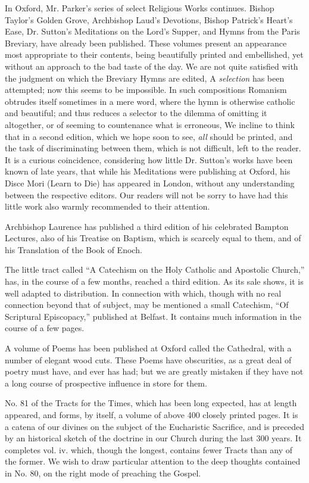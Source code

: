 In Oxford, Mr. Parker's series of select Religious
Works continues. Bishop Taylor's Golden Grove, Archbishop Laud's
Devotions, Bishop Patrick's Heart's Ease, Dr. Sutton's Meditations on
the Lord's Supper, and Hymns from the Paris Breviary, have already been
published. These volumes present an appearance most appropriate to their
contents, being beautifully printed and embellished, yet without an
approach to the bad taste of the day. We are not quite satisfied with
the judgment on which the Breviary Hymns are edited, A \emph{selection}
has been attempted; now this seems to be impossible. In such
compositions Romanism obtrudes itself sometimes in a mere word, where
the hymn is otherwise catholic and beautiful; and thus reduces a
selector to the dilemma of omitting it altogether, or of seeming to
countenance what is erroneous, We incline to think that in a second
edition, which we hope soon to see, \emph{all} should be printed, and
the task of discriminating between them, which is not difficult, left to
the reader. It is a curious coincidence, considering how little Dr.
Sutton's works have been known of late years, that while his Meditations
were publishing at Oxford, his Disce Mori (Learn to Die) has appeared in
London, without any understanding between the respective editors. Our
readers will not be sorry to have had this little work also warmly
recommended to their attention.

Archbishop Laurence has published a third edition
of his celebrated Bampton Lectures, also of his Treatise on Baptism,
which is scarcely equal to them, and of his Translation of the Book of
Enoch.

The little tract called ``A Catechism on the Holy
Catholic and Apostolic Church,'' has, in the course of a few months,
reached a third edition. As its sale shows, it is well adapted to
distribution. In connection with which, though with no real connection
beyond that of subject, may be mentioned a small Catechism, ``Of
Scriptural Episcopacy,'' published at Belfast. It contains much
information in the course of a few pages.

A volume of Poems has been published at Oxford
called the Cathedral, with a number of elegant wood cuts. These Poems
have obscurities, as a great deal of poetry must have, and ever has had;
but we are greatly mistaken if they have not a long course of
prospective influence in store for them.

No. 81 of the Tracts for the Times, which has been
long expected, has at length appeared, and forms, by itself, a volume of
above 400 closely printed pages. It is a catena of our divines on the
subject of the Eucharistic Sacrifice, and is preceded by an historical
sketch of the doctrine in our Church during the last 300 years. It
completes vol. iv. which, though the longest, contains fewer
Tracts than any of the former. We wish to draw particular attention to
the deep thoughts contained in No. 80, on the right mode of preaching
the Gospel.

